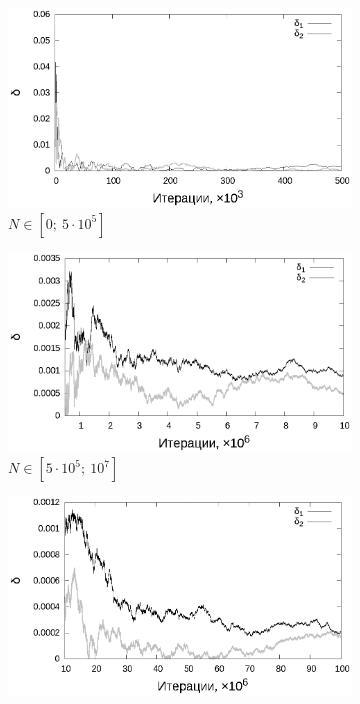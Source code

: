 \documentclass[11pt,a4paper]{article}
\theoremstyle{definition}
\begin{document}
\begin{figure}[h!]
  \begin{subfigure}[b]{0.3\textwidth}
    \includegraphics[width=\textwidth]{figs/classic/linear_log_10x_3_samples_10_variance_10_norm.log_0_500.eps}
    \caption{$N \in [0;~5 \cdot 10^5]$}
    \label{fig:classic_var10_n10_begin}
  \end{subfigure}
  \begin{subfigure}[b]{0.3\textwidth}
    \includegraphics[width=\textwidth]{figs/classic/linear_log_10x_3_samples_10_variance_10_norm.log_500_10000.eps}
    \caption{$N \in [5 \cdot 10^5;~10^7]$}
    \label{fig:classic_var10_n10_middle}
  \end{subfigure}
  \begin{subfigure}[b]{0.3\textwidth}
    \includegraphics[width=\textwidth]{figs/classic/linear_log_10x_3_samples_10_variance_10_norm.log_end.eps}

\end{subfigure}
\end{figure}
\end{document}
